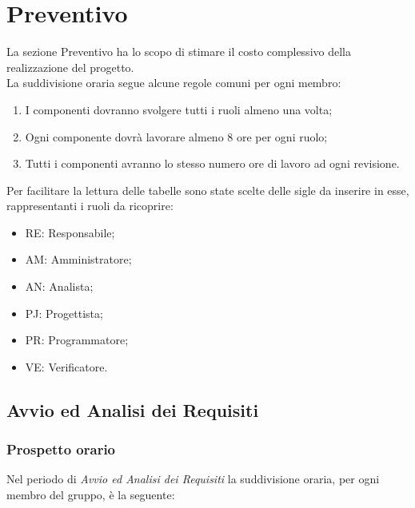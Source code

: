 \section{Preventivo}
\label{Preventivo}

La sezione Preventivo ha lo scopo di stimare il costo complessivo della realizzazione del progetto. \\ 
La suddivisione oraria segue alcune regole comuni per ogni membro:
\begin{enumerate}

	\item I componenti dovranno svolgere tutti i ruoli almeno una volta;
	\item Ogni componente dovrà lavorare almeno 8 ore per ogni ruolo;
	\item Tutti i componenti avranno lo stesso numero ore di lavoro ad ogni revisione.

\end{enumerate}
Per facilitare la lettura delle tabelle sono state scelte delle sigle da inserire in esse, rappresentanti i ruoli da ricoprire:
\begin{itemize}
	\item RE: Responsabile;
	\item AM: Amministratore;
	\item AN: Analista;
	\item PJ: Progettista;
	\item PR: Programmatore;
	\item VE: Verificatore.
\end{itemize}

\newpage
\subsection{Avvio ed Analisi dei Requisiti}
\label{PAAR}
\subsubsection{Prospetto orario}

Nel periodo di \textit{Avvio ed Analisi dei Requisiti} la suddivisione oraria, per ogni membro del gruppo, è la seguente:

